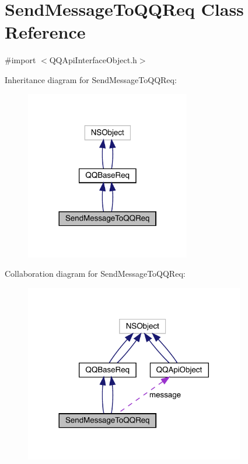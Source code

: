 \hypertarget{interface_send_message_to_q_q_req}{}\section{Send\+Message\+To\+Q\+Q\+Req Class Reference}
\label{interface_send_message_to_q_q_req}


{\ttfamily \#import $<$Q\+Q\+Api\+Interface\+Object.\+h$>$}



Inheritance diagram for Send\+Message\+To\+Q\+Q\+Req\+:\nopagebreak
\begin{figure}[H]
\begin{center}
\leavevmode
\includegraphics[width=204pt]{interface_send_message_to_q_q_req__inherit__graph}
\end{center}
\end{figure}


Collaboration diagram for Send\+Message\+To\+Q\+Q\+Req\+:\nopagebreak
\begin{figure}[H]
\begin{center}
\leavevmode
\includegraphics[width=272pt]{interface_send_message_to_q_q_req__coll__graph}
\end{center}
\end{figure}
